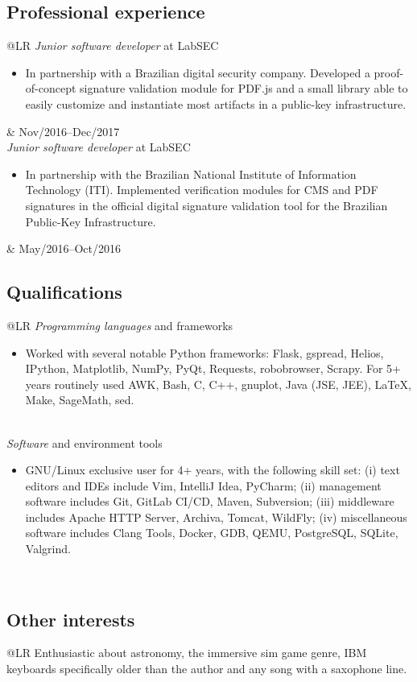 \documentclass[12pt]{article}
\makeatletter
\newenvironment{datetable}
  {\newcolumntype{R}{>{\raggedleft\arraybackslash}p{0.14\textwidth}}
   \newcolumntype{L}{p{0.82\textwidth}}
   \begin{tabular}{@{\hspace{0mm}}LR}}
  {\end{tabular}}
\newenvironment{contenttable}[1]
  {\subsection*{#1}
   \begin{datetable}}
  {\end{datetable}}
\makeatother
\begin{document}
\begin{contenttable}{Professional experience}
  \textit{Junior software developer} at LabSEC
  \begin{itemize}
    \item In partnership with a Brazilian digital security company. Developed a
        proof-of-concept signature validation module for PDF.js and a small
          library able to easily customize and instantiate most artifacts in a
          public-key infrastructure.
  \end{itemize} & Nov/2016--Dec/2017 \\

  \textit{Junior software developer} at LabSEC
  \begin{itemize}
    \item In partnership with the Brazilian National Institute of Information
        Technology (ITI). Implemented verification modules for CMS and PDF
          signatures in the official digital signature validation tool for the
          Brazilian Public-Key Infrastructure.
  \end{itemize} & May/2016--Oct/2016 \\[-4mm]
\end{contenttable}

\begin{contenttable}{Qualifications}
  \textit{Programming languages} and frameworks
  \begin{itemize}
    \item Worked with several notable Python frameworks: Flask, gspread,
        Helios, IPython, Matplotlib, NumPy, PyQt, Requests, robobrowser,
          Scrapy. For 5+ years routinely used AWK, Bash, C, C++, gnuplot, Java
          (JSE, JEE), \LaTeX{}, Make, SageMath, sed.
  \end{itemize} \\
  \textit{Software} and environment tools
  \begin{itemize}
    \item GNU/Linux exclusive user for 4+ years, with the following skill set:
        (i) text editors and IDEs include Vim, IntelliJ Idea, PyCharm; (ii)
          management software includes Git, GitLab CI/CD, Maven, Subversion;
          (iii) middleware includes Apache HTTP Server, Archiva, Tomcat,
          WildFly; (iv) miscellaneous software includes Clang Tools, Docker,
          GDB, QEMU, PostgreSQL, SQLite, Valgrind.
  \end{itemize} \\[-4mm]
\end{contenttable}

\begin{contenttable}{Other interests}
  Enthusiastic about astronomy, the immersive sim game genre, IBM keyboards
    specifically older than the author and any song with a saxophone line. \\
\end{contenttable}


\nobibliography{\jobname}
\end{document}
